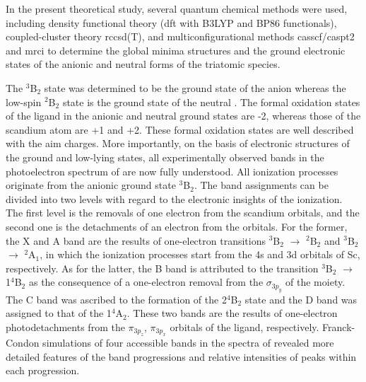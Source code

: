 \begin{refsection}
In the present theoretical study, several quantum chemical methods were used, including density functional theory (\acrshort{dft}  with B3LYP and BP86 functionals), coupled-cluster theory \acrshort{rccsd}(T), and multiconfigurational methods \acrshort{casscf}/\acrshort{caspt2} and \acrshort{mrci} to determine the global minima structures and the ground electronic states of the anionic and neutral forms of the triatomic  species. 
          



The $^3$B$_2$ state was determined to be the ground state of the anion  whereas the low-spin $^2$B$_2$ state is the ground state of the neutral . The formal oxidation states of the  ligand in the anionic and neutral ground states are -2, whereas those of the scandium atom are +1 and +2. These formal oxidation states are well described with the \acrshort{aim} charges. More importantly, on the basis of electronic structures of the ground and low-lying states, all experimentally observed bands in the photoelectron spectrum of  are now fully understood. All ionization processes originate from the anionic ground state $^3$B$_2$. The band assignments can be divided into two levels with regard to the electronic insights of the ionization. The first level is the removals of one electron from the scandium orbitals, and the second one is the detachments of an electron from the  orbitals. For the former, the X and A band are the results of one-electron transitions $^3$B$_2$ $\longrightarrow$ $^2$B$_2$ and $^3$B$_2$ $\longrightarrow$ $^2$A$_1$, in which the ionization processes start from the 4s and 3d orbitals of Sc, respectively. As for the latter, the B band is attributed to the transition $^3$B$_2$ $\longrightarrow$ 1$^4$B$_2$ as the consequence of a one-electron removal from the $\sigma_{3p_y}$ of the  moiety. The C band was ascribed to the formation of the 2$^4$B$_2$ state and the D band was assigned to that of the 1$^4$A$_2$. These two bands are the results of one-electron photodetachments from the $\pi_{3p_z}$, $\pi_{3p_x}$ orbitals of the  ligand, respectively. Franck-Condon simulations of four accessible bands in the spectra of  revealed more detailed features of the band progressions and relative intensities of peaks within each progression.










\printbibliography[heading=subbibliography] %

\end{refsection}

